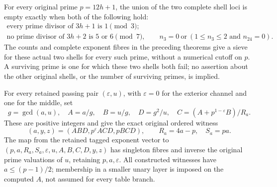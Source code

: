 \begin{corollary}
\label{cor:two-shell-sieve-return}
For every original prime \(p=12h+1\), the union of the two complete
shell loci is empty exactly when both of the following hold:
\[
 \begin{gathered}
 \text{every prime divisor of }3h+1\text{ is }1\pmod3;\\
 \text{no prime divisor of }3h+2\text{ is }5\text{ or }6\pmod7,\qquad
 n_3=0\ \text{or}\ (1\le n_3\le2\text{ and }n_{24}=0).
 \end{gathered}
\]
The counts and complete exponent fibres in the preceding theorems
give a sieve for these actual two shells for every such prime,
without a numerical cutoff on \(p\). A surviving prime is one
for which these two shells both fail; no assertion about the other
original shells, or the number of surviving primes, is implied.

For every retained passing pair \((\varepsilon,u)\), with
\(\varepsilon=0\) for the exterior channel and one for the middle,
set
\[
 g=\gcd(a,u),\quad A=a/g,\quad B=u/g,\quad D=g^2/u,\quad
 C=(A+p^{1-\varepsilon}B)/R_a.
\]
These are positive integers and give the exact original ordered witness
\[
 (a,y,z)=(ABD,p^\varepsilon ACD,pBCD),\qquad
 R_a=4a-p,\quad S_a=pa.
\]
The map from the retained tagged exponent vector to
\((p,a,R_a,S_a,\varepsilon,u,A,B,C,D,y,z)\) has singleton fibres
and inverse the original prime valuations of \(u\), retaining
\(p,a,\varepsilon\). All constructed witnesses have
\(a\le(p-1)/2\); membership in a smaller unary layer is imposed
on the computed \(A\), not assumed for every table branch.
\end{corollary}
